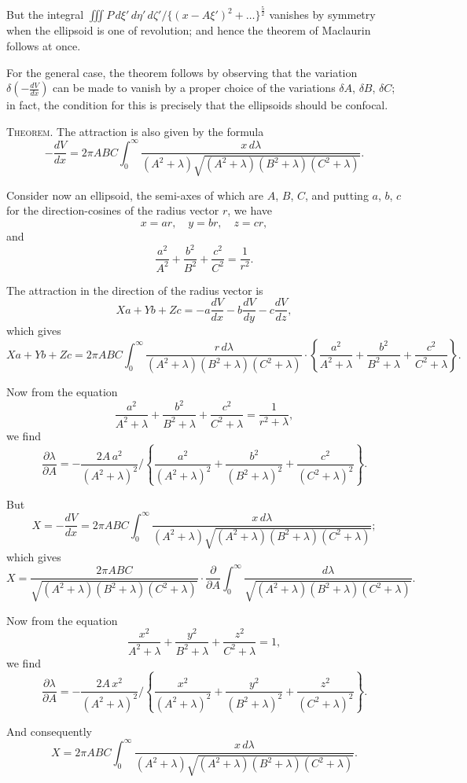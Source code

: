 \documentclass[11pt,a4paper]{book}
\begin{document}
But the integral $\iiint P\, d\xi'\, d\eta'\, d\zeta' / \{(x-A\xi')^2 + \ldots\}^{\frac{5}{2}}$ vanishes by symmetry when the ellipsoid is one of revolution; and hence the theorem of Maclaurin follows at once.

For the general case, the theorem follows by observing that the variation $\delta(-\frac{dV}{dx})$ can be made to vanish by a proper choice of the variations $\delta A$, $\delta B$, $\delta C$; in fact, the condition for this is precisely that the ellipsoids should be confocal.

\textsc{Theorem.} The attraction is also given by the formula
\[
-\frac{dV}{dx} = 2\pi ABC \int_0^{\infty} \frac{x\, d\lambda}{(A^2+\lambda)\sqrt{(A^2+\lambda)(B^2+\lambda)(C^2+\lambda)}}.
\]

Consider now an ellipsoid, the semi-axes of which are $A$, $B$, $C$, and putting $a$, $b$, $c$ for the direction-cosines of the radius vector $r$, we have
\[
x = ar, \quad y = br, \quad z = cr,
\]
and
\[
\frac{a^2}{A^2} + \frac{b^2}{B^2} + \frac{c^2}{C^2} = \frac{1}{r^2}.
\]

The attraction in the direction of the radius vector is
\[
Xa + Yb + Zc = -a\frac{dV}{dx} - b\frac{dV}{dy} - c\frac{dV}{dz},
\]
which gives
\[
Xa + Yb + Zc = 2\pi ABC \int_0^{\infty} \frac{r\, d\lambda}{(A^2+\lambda)(B^2+\lambda)(C^2+\lambda)} \cdot \left\{\frac{a^2}{A^2+\lambda} + \frac{b^2}{B^2+\lambda} + \frac{c^2}{C^2+\lambda}\right\}.
\]

Now from the equation
\[
\frac{a^2}{A^2+\lambda} + \frac{b^2}{B^2+\lambda} + \frac{c^2}{C^2+\lambda} = \frac{1}{r^2+\lambda},
\]
we find
\[
\frac{\partial\lambda}{\partial A} = -\frac{2A\, a^2}{(A^2+\lambda)^2} \Big/ \left\{\frac{a^2}{(A^2+\lambda)^2} + \frac{b^2}{(B^2+\lambda)^2} + \frac{c^2}{(C^2+\lambda)^2}\right\}.
\]

But
\[
X = -\frac{dV}{dx} = 2\pi ABC \int_0^{\infty} \frac{x\, d\lambda}{(A^2+\lambda)\sqrt{(A^2+\lambda)(B^2+\lambda)(C^2+\lambda)}};
\]
which gives
\[
X = \frac{2\pi ABC}{\sqrt{(A^2+\lambda)(B^2+\lambda)(C^2+\lambda)}} \cdot \frac{\partial}{\partial A} \int_0^{\infty} \frac{d\lambda}{\sqrt{(A^2+\lambda)(B^2+\lambda)(C^2+\lambda)}}.
\]

Now from the equation
\[
\frac{x^2}{A^2+\lambda} + \frac{y^2}{B^2+\lambda} + \frac{z^2}{C^2+\lambda} = 1,
\]
we find
\[
\frac{\partial\lambda}{\partial A} = -\frac{2A\, x^2}{(A^2+\lambda)^2} \Big/ \left\{\frac{x^2}{(A^2+\lambda)^2} + \frac{y^2}{(B^2+\lambda)^2} + \frac{z^2}{(C^2+\lambda)^2}\right\}.
\]

And consequently
\[
X = 2\pi ABC \int_0^{\infty} \frac{x\, d\lambda}{(A^2+\lambda)\sqrt{(A^2+\lambda)(B^2+\lambda)(C^2+\lambda)}}.
\]
\end{document}
